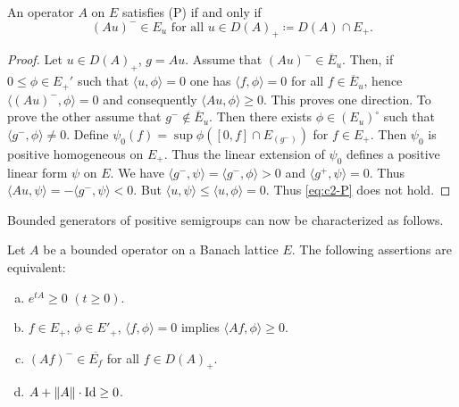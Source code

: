\begin{lemma}\label{lem:c2-1.10}
An operator $A$ on $E$ satisfies (P) if and only if
\begin{equation}\label{eq:c2-1.8}
(Au)^{-} \in E_{u} \text{ for all } u \in D(A)_{+} \coloneqq D(A) \cap E_{+}.
\end{equation}
\end{lemma}
\begin{proof}
Let $u \in D(A)_{+}$, $g = Au$.
Assume that $(Au)^{-} \in \overline{E}_{u}$.
Then, if $0 \leq \phi \in E_{+}'$ such that $\langle u,\phi \rangle = 0$ one has $\langle f,\phi \rangle = 0$ for all $f \in \overline{E}_{u}$, hence $\langle (Au)^{-},\phi \rangle = 0$ and consequently $\langle Au,\phi \rangle \geq 0$.
This proves one direction.
To prove the other assume that $g^{-} \not\in \overline{E}_{u}$.
Then there exists $\phi \in (E_{u})^{\circ}$ such that $\langle g^{-},\phi \rangle \not= 0$.
Define $\psi_{0}(f) = \sup \phi([0,f] \cap E_{(g^{-})})$ for $f \in E_{+}$.
Then $\psi_{0}$ is positive homogeneous on $E_{+}$.
Thus the linear extension of $\psi_{0}$ defines a positive linear form $\psi$ on $E$.
We have $\langle g^{-},\psi \rangle = \langle g^{-},\phi \rangle > 0$ and $\langle g^{+},\psi \rangle = 0$.
Thus $\langle Au,\psi \rangle = - \langle g^{-},\psi \rangle < 0$.
But $\langle u,\psi \rangle \leq \langle u,\phi \rangle = 0$.
Thus  \eqref{eq:c2-P}   does not hold.
\end{proof}

Bounded generators of positive semigroups can now be characterized as follows.

\begin{theorem}\label{thm:c2-1.11}
Let $A$ be a bounded operator on a Banach lattice $E$.
The following assertions are equivalent:
\begin{enumerate}[(a)]
\item \label{thm:c2-1.11-1}
$e^{tA} \geq 0$ $(t \geq 0)$.
\item \label{thm:c2-1.11-2}
$f \in E_{+}$, $\phi \in E'_{+}$, $\langle f,\phi \rangle = 0$ implies $\langle Af,\phi \rangle \geq 0$.
\item \label{thm:c2-1.11-3}
$(Af)^{-} \in \overline{E_{f}}$ for all $f \in D(A)_{+}$.
\item \label{thm:c2-1.11-4}
$A + \|A\| \cdot \operatorname{Id} \geq 0$.
\end{enumerate}
\end{theorem}

